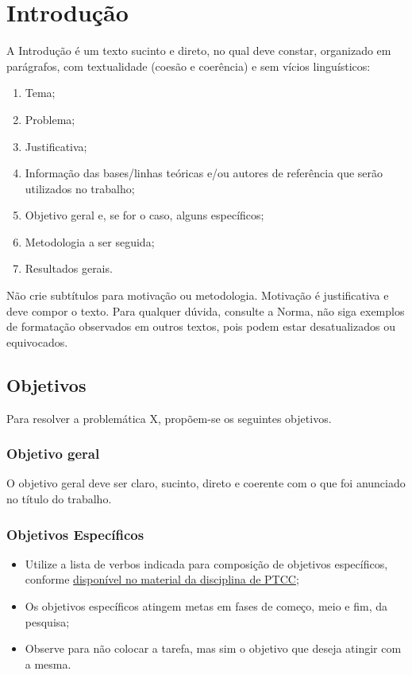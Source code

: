 \chapter{Introdução}
\label{Chap:intro}

A Introdução é um texto sucinto e direto, no qual deve constar, organizado em parágrafos, com textualidade (coesão e coerência) e sem vícios linguísticos:

\begin{enumerate}[label=\alph*)]
    \item Tema;
    \item Problema;
    \item Justificativa;
    \item Informação das bases/linhas teóricas e/ou autores de referência que serão utilizados no trabalho;
    \item Objetivo geral e, se for o caso, alguns específicos;
    \item Metodologia a ser seguida;
    \item Resultados gerais.
\end{enumerate}

Não crie subtítulos para motivação ou metodologia.
Motivação é justificativa e deve compor o texto.
Para qualquer dúvida, consulte a Norma, não siga exemplos de formatação observados em outros textos, pois podem estar desatualizados ou equivocados.

\section{Objetivos}

Para resolver a problemática X, propõem-se os seguintes objetivos.

\subsection{Objetivo geral}

O objetivo geral deve ser claro, sucinto, direto e coerente com o que foi anunciado no título do trabalho.

\subsection{Objetivos Específicos}

\begin{itemize}
    \item Utilize a lista de verbos indicada para composição de objetivos específicos, conforme  \href{https://www.youtube.com/watch?v=Ycl5a-5gR4w}{disponível no material da disciplina de PTCC};
    \item Os objetivos específicos atingem metas em fases de começo, meio e fim, da pesquisa;
    \item Observe para não colocar a tarefa, mas sim o objetivo que deseja atingir com a mesma.
\end{itemize}
